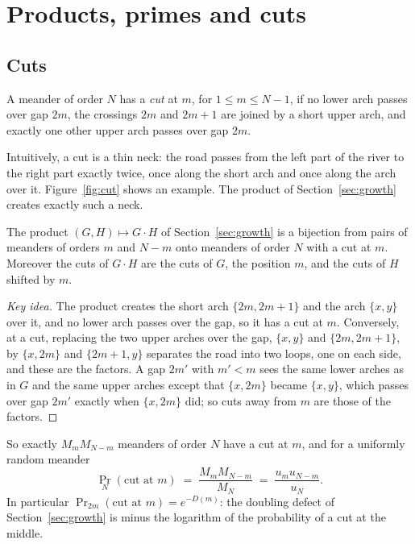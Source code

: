 \section{Products, primes and cuts}\label{sec:products}

\subsection{Cuts}

\begin{definition}
A meander of order $N$ has a \emph{cut} at $m$, for $1\le m\le N-1$, if no lower arch passes over
gap $2m$, the crossings $2m$ and $2m+1$ are joined by a short upper arch, and exactly one other upper
arch passes over gap $2m$.
\end{definition}

Intuitively, a cut is a thin neck: the road passes from the left part of the river to the right part
exactly twice, once along the short arch and once along the arch over it. Figure~\ref{fig:cut} shows
an example. The product of Section~\ref{sec:growth} creates exactly such a neck.

\begin{theorem}\label{thm:cuts}
The product $(G,H)\mapsto G\cdot H$ of Section~\ref{sec:growth} is a bijection from pairs of meanders
of orders $m$ and $N-m$ onto meanders of order $N$ with a cut at $m$. Moreover the cuts of $G\cdot H$
are the cuts of $G$, the position $m$, and the cuts of $H$ shifted by $m$.
\end{theorem}

\begin{proof}[Key idea]
The product creates the short arch $\{2m,2m+1\}$ and the arch $\{x,y\}$ over it, and no lower arch
passes over the gap, so it has a cut at $m$. Conversely, at a cut, replacing the two upper arches
over the gap, $\{x,y\}$ and $\{2m,2m+1\}$, by $\{x,2m\}$ and $\{2m+1,y\}$ separates the road into two loops, one on each
side, and these are the factors. A gap $2m'$ with $m'<m$ sees the same lower arches as in $G$ and the
same upper arches except that $\{x,2m\}$ became $\{x,y\}$, which passes over gap $2m'$ exactly when
$\{x,2m\}$ did; so cuts away from $m$ are those of the factors.
\end{proof}

So exactly $M_mM_{N-m}$ meanders of order $N$ have a cut at $m$, and for a uniformly random meander
\begin{equation}\label{eq:cutprob}
\Pr_N(\text{cut at }m)\;=\;\frac{M_mM_{N-m}}{M_N}\;=\;\frac{u_mu_{N-m}}{u_N}.
\end{equation}
In particular $\Pr_{2m}(\text{cut at }m)=e^{-D(m)}$: the doubling defect of Section~\ref{sec:growth}
is minus the logarithm of the probability of a cut at the middle.

